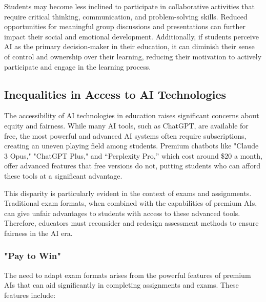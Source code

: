 \documentclass{article}
\begin{document}
Students may become less inclined to participate in collaborative activities that require critical thinking, communication, and problem-solving skills. Reduced opportunities for meaningful group discussions and presentations can further impact their social and emotional development. Additionally, if students perceive AI as the primary decision-maker in their education, it can diminish their sense of control and ownership over their learning, reducing their motivation to actively participate and engage in the learning process.

\subsection{Inequalities in Access to AI Technologies}

The accessibility of AI technologies in education raises significant concerns about equity and fairness. While many AI tools, such as ChatGPT, are available for free, the most powerful and advanced AI systems often require subscriptions, creating an uneven playing field among students. Premium chatbots like "Claude 3 Opus," "ChatGPT Plus," and “Perplexity Pro,” which cost around \$20 a month, offer advanced features that free versions do not, putting students who can afford these tools at a significant advantage.

This disparity is particularly evident in the context of exams and assignments. Traditional exam formats, when combined with the capabilities of premium AIs, can give unfair advantages to students with access to these advanced tools. Therefore, educators must reconsider and redesign assessment methods to ensure fairness in the AI era.

\subsubsection{"Pay to Win"}

The need to adapt exam formats arises from the powerful features of premium AIs that can aid significantly in completing assignments and exams. These features include:
\end{document}
